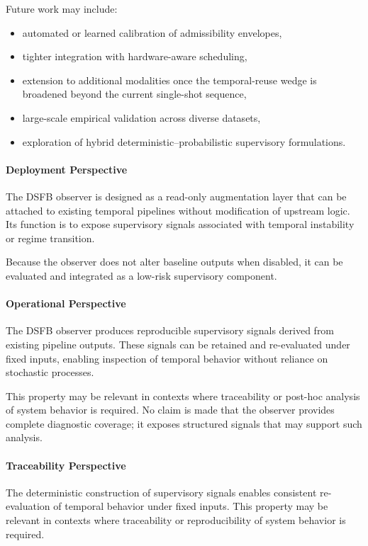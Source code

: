 \documentclass[11pt,letterpaper]{article}
\theoremstyle{gcresult}
\theoremstyle{definition}
\begin{document}
Future work may include:

\begin{itemize}[leftmargin=1.5em]
    \item automated or learned calibration of admissibility envelopes,
    \item tighter integration with hardware-aware scheduling,
    \item extension to additional modalities once the temporal-reuse wedge is broadened beyond the current single-shot sequence,
    \item large-scale empirical validation across diverse datasets,
    \item exploration of hybrid deterministic–probabilistic supervisory formulations.
\end{itemize}


\paragraph{Deployment Perspective}
The DSFB observer is designed as a read-only augmentation layer that can be attached to existing temporal pipelines without modification of upstream logic. Its function is to expose supervisory signals associated with temporal instability or regime transition.

Because the observer does not alter baseline outputs when disabled, it can be evaluated and integrated as a low-risk supervisory component.

\paragraph{Operational Perspective}

The DSFB observer produces reproducible supervisory signals derived from existing pipeline outputs. These signals can be retained and re-evaluated under fixed inputs, enabling inspection of temporal behavior without reliance on stochastic processes.

This property may be relevant in contexts where traceability or post-hoc analysis of system behavior is required. No claim is made that the observer provides complete diagnostic coverage; it exposes structured signals that may support such analysis.

\paragraph{Traceability Perspective}

The deterministic construction of supervisory signals enables consistent re-evaluation of temporal behavior under fixed inputs. This property may be relevant in contexts where traceability or reproducibility of system behavior is required.
\end{document}
